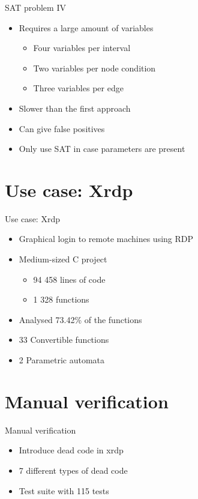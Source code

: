 \documentclass[10pt]{beamer}
\begin{document}
\begin{frame}{SAT problem IV}
\begin{itemize}
	\item Requires a large amount of variables
	\pause
	\begin{itemize}
		\item Four variables per interval
		\pause
		\item Two variables per node condition
		\pause
		\item Three variables per edge
	\end{itemize}
	\pause
	\item Slower than the first approach
	\pause
	\item Can give false positives
	\pause
	\item Only use SAT in case parameters are present
\end{itemize}
\end{frame}

\section{Use case: Xrdp}

\begin{frame}{Use case: Xrdp}
	\begin{itemize}
		\item Graphical login to remote machines using RDP
		\pause
		\item Medium-sized C project
		\begin{itemize}
			\item 94 458 lines of code
			\item 1 328 functions
		\end{itemize}
		\pause
		\item Analysed 73.42\% of the functions
		\pause
		\item 33 Convertible functions
		\pause
		\item 2 Parametric automata
	\end{itemize}
\end{frame}

\section{Manual verification}

\begin{frame}{Manual verification}
\begin{itemize}
	\item Introduce dead code in xrdp
	\pause
	\item 7 different types of dead code 
	\pause
	\item Test suite with 115 tests
\end{itemize}
\end{frame}
\end{document}
